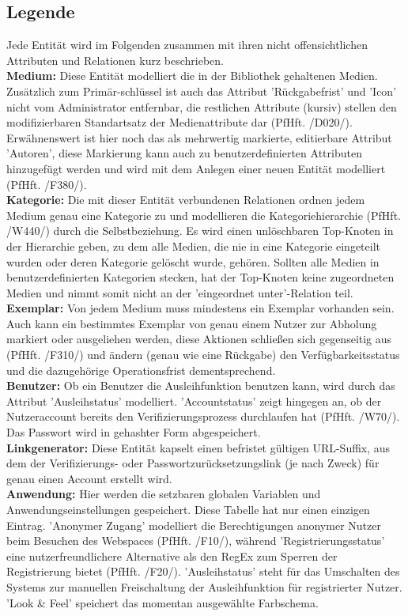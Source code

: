 \documentclass{article}
\begin{document}
\subsection{Legende}
Jede Entität wird im Folgenden zusammen mit ihren nicht offensichtlichen Attributen und Relationen kurz beschrieben.\\
\textbf{Medium:} Diese Entität modelliert die in der Bibliothek gehaltenen Medien. Zusätzlich zum Primär-schlüssel ist auch das Attribut 'Rückgabefrist' und 'Icon' nicht vom Administrator entfernbar, die restlichen Attribute (kursiv) stellen den modifizierbaren Standartsatz der Medienattribute dar (PfHft. /D020/). Erwähnenswert ist hier noch das als mehrwertig markierte, editierbare Attribut 'Autoren', diese Markierung kann auch zu benutzerdefinierten Attributen hinzugefügt werden und wird mit dem Anlegen einer neuen Entität modelliert (PfHft. /F380/).\\
\textbf{Kategorie:} Die mit dieser Entität verbundenen Relationen ordnen jedem Medium genau eine Kategorie zu und modellieren die Kategoriehierarchie (PfHft. /W440/) durch die Selbstbeziehung. Es wird einen unlöschbaren Top-Knoten in der Hierarchie geben, zu dem alle Medien, die nie in eine Kategorie eingeteilt wurden oder deren Kategorie gelöscht wurde, gehören. Sollten alle Medien in benutzerdefinierten Kategorien stecken, hat der Top-Knoten keine zugeordneten Medien und nimmt somit nicht an der 'eingeordnet unter'-Relation teil.\\
\textbf{Exemplar:} Von jedem Medium muss mindestens ein Exemplar vorhanden sein. Auch kann ein bestimmtes Exemplar von genau einem Nutzer zur Abholung markiert oder ausgeliehen werden, diese Aktionen schließen sich gegenseitig aus (PfHft. /F310/) und ändern (genau wie eine Rückgabe) den Verfügbarkeitsstatus und die dazugehörige Operationsfrist dementsprechend. \\
\textbf{Benutzer:} Ob ein Benutzer die Ausleihfunktion benutzen kann, wird durch das Attribut 'Ausleihstatus' modelliert. 'Accountstatus' zeigt hingegen an, ob der Nutzeraccount bereits den Verifizierungsprozess durchlaufen hat (PfHft. /W70/). Das Passwort wird in gehashter Form abgespeichert. \\
\textbf{Linkgenerator:} Diese Entität kapselt einen befristet gültigen URL-Suffix, aus dem der Verifizierungs- oder Passwortzurücksetzungslink (je nach Zweck) für genau einen Account erstellt wird.\\
\textbf{Anwendung:} Hier werden die setzbaren globalen Variablen und Anwendungseinstellungen gespeichert. Diese Tabelle hat nur einen einzigen Eintrag. 'Anonymer Zugang' modelliert die Berechtigungen anonymer Nutzer beim Besuchen des Webspaces (PfHft. /F10/), während 'Registrierungsstatus' eine nutzerfreundlichere Alternative als den RegEx zum Sperren der Registrierung bietet (PfHft. /F20/). 'Ausleihstatus' steht für das Umschalten des Systems zur manuellen Freischaltung der Ausleihfunktion für registrierter Nutzer. 'Look \& Feel' speichert das momentan ausgewählte Farbschema. \\
\end{document}
